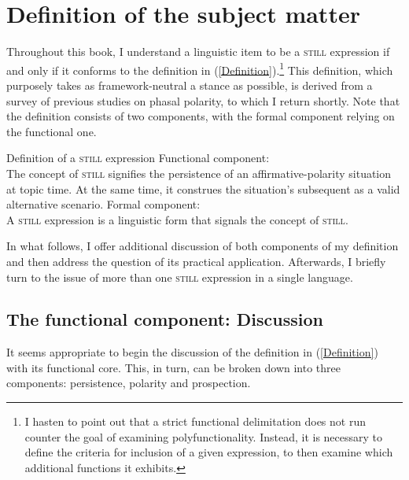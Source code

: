 \section{Definition of the subject matter}
\label{sectionDefinition}
Throughout this book, I understand a linguistic item to be a \textsc{still} expression if and only if it conforms to the definition in (\ref{Definition}).\footnote{I hasten to point out that a strict functional delimitation does not run counter the goal of examining polyfunctionality. Instead, it is necessary to define the criteria for inclusion of a given expression, to then examine which additional functions it exhibits.} This definition, which purposely takes as framework-neutral a stance as possible, is derived from a survey of previous studies on phasal polarity, to which I return shortly. Note that the definition consists of two components, with the formal component relying on the functional one.

\begin{exe}
	\ex 
	\label{Definition}
	\begin{xlist}
		\exi{}Definition of a \textsc{still} expression
		\ex\label{CCfunctional}  
	Functional component:\\The concept of \textsc{still} signifies the persistence of an affirmative-polarity situation at topic time. At the same time, it construes the situation's subsequent  as a valid alternative scenario.
		\ex\label{CCformal} 
	Formal component:\\A \textsc{still} expression is a linguistic form  that signals the concept of \textsc{still}.
	\end{xlist}
\end{exe}

In what follows, I offer additional discussion of both components of my definition and then address the question of its practical application. Afterwards, I briefly turn to the issue of more than one \textsc{still} expression in a single language.

\subsection{The functional component: Discussion}
\label{secFunctionalDiscussion}
It seems appropriate to begin the discussion of the definition in (\ref{Definition}) with its functional core. This, in turn, can be broken down into three components: persistence, polarity and prospection.

